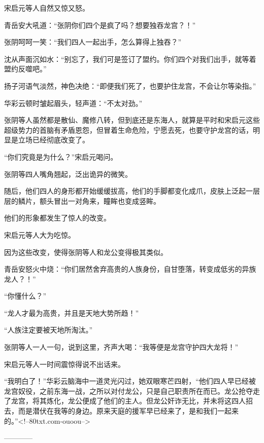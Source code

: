 \begin{this_body}
宋启元等人自然又惊又怒。

青岳安大吼道：“张阴你们四个是疯了吗？想要独吞龙宫？！”

张阴呵呵一笑：“我们四人一起出手，怎么算得上独吞？”

沈从声面沉如水：“别忘了，我们可是签订了盟约。你们四个对我们出手，就等着盟约反噬吧。”

扬子河语气淡然，神色决绝：“即便我们死了，也要护住龙宫，不会让尔等染指。”

华彩云顿时皱起眉头，轻声道：“不太对劲。”

张阴等人虽然都是散仙、魔修八转，但到底还是东海人，就算是平时和宋启元这些超级势力的首脑有矛盾恩怨，但冒着生命危险，宁愿去死，也要守护龙宫的话，明显是立场已经彻底改变了。

“你们究竟是为什么？”宋启元喝问。

张阴等四人嘴角翘起，泛出诡异的微笑。

随后，他们四人的身形都开始缓缓拔高，他们的手脚都变化成爪，皮肤上泛起一层层的鳞片，额头冒出一对角来，瞳眸也变成竖眸。

他们的形象都发生了惊人的改变。

宋启元等人大为吃惊。

因为这些改变，使得张阴等人和龙公变得极其类似。

青岳安怒火中烧：“你们居然舍弃高贵的人族身份，自甘堕落，转变成低劣的异族龙人？！”

“你懂什么？”

“龙人才最为高贵，并且是天地大势所趋！”

“人族注定要被天地所淘汰。”

张阴等人一人一句，说到这里，齐声大喝：“我等便是龙宫守护四大龙将！”

宋启元等人一时间震惊得说不出话来。

“我明白了！”华彩云脑海中一道灵光闪过，她双眼寒芒四射，“他们四人早已经被龙宫奴役，之前东海一战，之所以对付龙公，只是自己职责所在而已。龙公抢夺走了龙宫，将其炼化，龙公便成了他们的主人。但龙公奸诈无比，并未将这四人招去，而是潜伏在我等的身边。原来天庭的援军早已经来了，是和我们一起来的。”<!--80txt.com-ouoou-->

------------

\end{this_body}

